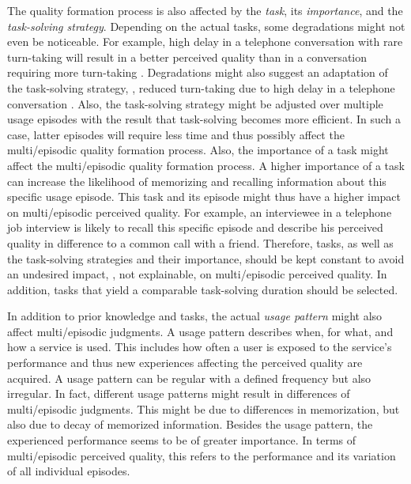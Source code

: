 The quality formation process is also affected by the \emph{task}, its \emph{importance}, and the \emph{task-solving strategy}.
Depending on the actual tasks, some degradations might not even be noticeable.
For example, high delay in a telephone conversation with rare turn-taking will result in a better perceived quality than in a conversation requiring more turn-taking \citep[\eg,][]{egger_it_2010, schoenenberg_quality_2015}.
Degradations might also suggest an adaptation of the task-solving strategy, \eg, reduced turn-taking due to high delay in a telephone conversation \citep[][]{schoenenberg_quality_2015}.
Also, the task-solving strategy might be adjusted over multiple usage episodes with the result that task-solving becomes more efficient.
In such a case, latter episodes will require less time and thus possibly affect the multi\-/episodic quality formation process.
Also, the importance of a task might affect the multi\-/episodic quality formation process.
A higher importance of a task can increase the likelihood of memorizing and recalling information about this specific usage episode.
This task and its episode might thus have a higher impact on multi\-/episodic perceived quality.
For example, an interviewee in a telephone job interview is likely to recall this specific episode and describe his perceived quality in difference to a common call with a friend.
Therefore, tasks, as well as the task-solving strategies and their importance, should be kept constant to avoid an undesired impact, \ie, not explainable, on multi\-/episodic perceived quality.
In addition, tasks that yield a comparable task-solving duration should be selected.

In addition to prior knowledge and tasks, the actual \emph{usage pattern} might also affect multi\-/episodic judgments.
A usage pattern describes when, for what, and how a service is used.
This includes how often a user is exposed to the service's performance and thus new experiences affecting the perceived quality are acquired.
A usage pattern can be regular with a defined frequency but also irregular.
In fact, different usage patterns might result in differences of multi\-/episodic judgments.
This might be due to differences in memorization, but also due to decay of memorized information.
Besides the usage pattern, the experienced performance  seems to be of greater importance.
In terms of multi\-/episodic perceived quality, this refers to the performance and its variation of all individual episodes.

